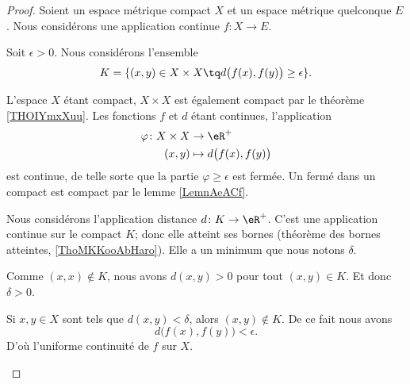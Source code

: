 \begin{proof}
	Soient un espace métrique compact \( X\) et un espace métrique quelconque \( E\). Nous considérons une application continue \( f\colon X\to E\).

	\begin{subproof}
		\spitem[Un ensemble]
		Soit \( \epsilon>0\). Nous considérons l'ensemble
		\begin{equation}
			K=\{ (x,y)\in X\times X\tq d\big( f(x), f(y) \big)\geq \epsilon \}.
		\end{equation}

		L'espace \( X\) étant compact, \( X\times X\) est également compact par le théorème \ref{THOIYmxXuu}. Les fonctions \( f\) et \( d\) étant continues, l'application
		\begin{equation}
			\begin{aligned}
				\varphi\colon X\times X & \to \eR^+                       \\
				(x,y)                   & \mapsto d\big( f(x), f(y) \big)
			\end{aligned}
		\end{equation}
		est continue, de telle sorte que la partie \( \varphi\geq \epsilon\) est fermée. Un fermé dans un compact est compact par le lemme \ref{LemnAeACf}.

		Nous considérons l'application distance \( d\colon K\to \eR^+\). C'est une application continue sur le compact \( K\); donc elle atteint ses bornes (théorème des bornes atteintes, \ref{ThoMKKooAbHaro}). Elle a un minimum que nous notons \( \delta\).

		Comme \( (x,x)\notin K\), nous avons \( d(x,y)>0\) pour tout \( (x,y)\in K\). Et donc \( \delta>0\).

		\spitem[Conclusion]
		Si \( x,y\in X\) sont tels que \( d(x,y)<\delta\), alors \( (x,y)\notin K\). De ce fait nous avons
		\begin{equation}
			d\big( f(x), f(y) \big)<\epsilon.
		\end{equation}
		D'où l'uniforme continuité de \( f\) sur \( X\).
	\end{subproof}
\end{proof}

